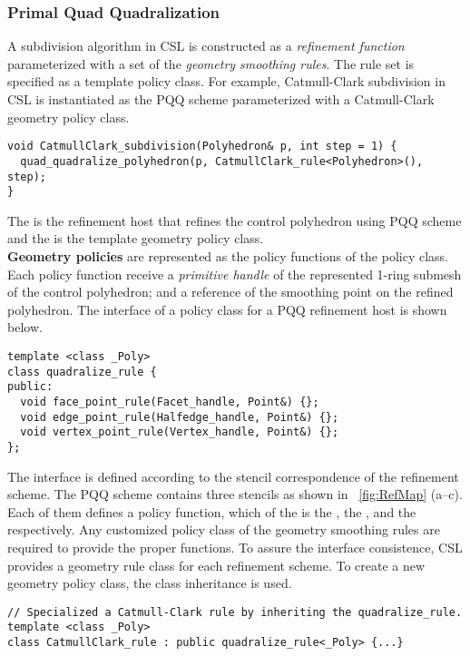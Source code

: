 

\subsubsection{Primal Quad Quadralization}

A subdivision algorithm in CSL is constructed as a
\emph{refinement function} parameterized with a set of the  
\emph{geometry smoothing rules}. The rule set is specified as
a template policy class. For example, Catmull-Clark
subdivision in CSL is instantiated as the PQQ scheme 
parameterized with a Catmull-Clark geometry policy class.
\begin{lstlisting}
void CatmullClark_subdivision(Polyhedron& p, int step = 1) {
  quad_quadralize_polyhedron(p, CatmullClark_rule<Polyhedron>(), step);
}
\end{lstlisting}
The  is the refinement host
that refines the control polyhedron using PQQ scheme and the  
 is the template geometry policy class.
\\

\noindent \textbf{Geometry policies} are represented as
the policy functions of the policy class. Each policy function
receive a \emph{primitive handle} of the represented 1-ring submesh 
of the control polyhedron; and a reference of the smoothing point
on the refined polyhedron. The interface of a policy class for a PQQ
refinement host is shown below.
\begin{lstlisting}
template <class _Poly>
class quadralize_rule {
public:
  void face_point_rule(Facet_handle, Point&) {};
  void edge_point_rule(Halfedge_handle, Point&) {};
  void vertex_point_rule(Vertex_handle, Point&) {};
};
\end{lstlisting}
The interface is defined according to
the stencil correspondence of the refinement scheme. 
The PQQ scheme contains three stencils as shown in
\figurename\ \ref{fig:RefMap} (a--c). Each of them
defines a policy function, which of the  
is the , 
the , and the  
respectively. Any customized policy class of the geometry 
smoothing rules are required to provide the proper functions.
To assure the interface consistence, CSL provides
a geometry rule class for each refinement scheme. To create a new
geometry policy class, the class inheritance is used.
\begin{lstlisting}
// Specialized a Catmull-Clark rule by inheriting the quadralize_rule.
template <class _Poly>
class CatmullClark_rule : public quadralize_rule<_Poly> {...}
\end{lstlisting}

